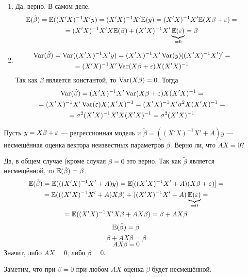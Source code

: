 \begin{problem}
\begin{sol}
\begin{enumerate}
\item
Да, верно. В самом деле,
\begin{multline*}
\mathbb{E}(\hat\beta)=\mathbb{E}((X'X)^{-1}X'y)=(X'X)^{-1}X'\mathbb{E}(y)=(X'X)^{-1}X'\mathbb{E}(X\beta+\varepsilon)=\\
=(X'X)^{-1}X'X\mathbb{E}(\beta)+(X'X)^{-1}X'\underbrace{\mathbb{E}(\varepsilon)}_{=0}=\beta
\end{multline*}


\item
\begin{multline*}
\operatorname{Var}(\hat\beta)=\operatorname{Var}((X'X)^{-1}X'y)=(X'X)^{-1}X'\operatorname{Var}(y)((X'X)^{-1}X')'=\\
=(X'X)^{-1}X'\operatorname{Var}(X\beta+\varepsilon)X(X'X)^{-1}
\end{multline*}
Так как $\beta$ является константой, то $\operatorname{Var}(X\beta)=0$. Тогда
\begin{multline*}
\operatorname{Var}(\hat\beta)=(X'X)^{-1}X'\operatorname{Var}(X\beta+\varepsilon)X(X'X)^{-1}=\\=(X'X)^{-1}X'\operatorname{Var}(\varepsilon)X(X'X)^{-1}=
(X'X)^{-1}X'\sigma^2X(X'X)^{-1}=\\=\sigma^2(X'X)^{-1}X'X(X'X)^{-1}=\sigma^2(X'X)^{-1}
\end{multline*}
\end{enumerate}

\end{sol}
\end{problem}


\begin{problem}
Пусть $y = X\beta + \varepsilon$ — регрессионная модель и $\tilde{\beta} = ((X'X)^{-1}X'+ A)y$ — несмещённая оценка вектора неизвестных параметров $\beta$. Верно ли, что $AX=0$?


\begin{sol}
Да, в общем случае (кроме случая $\beta=0$ это верно. Так как $\tilde\beta$ является несмещённой, то $\mathbb{E}(\tilde\beta)=\beta$.
\begin{multline*}
\mathbb{E}(\tilde\beta)=\mathbb{E}(((X'X)^{-1}X'+A)y)=\mathbb{E}[((X'X)^{-1}X'+A)(X\beta+\varepsilon)]=\\=
\mathbb{E}(((X'X)^{-1}X'+A)X\beta)+((X'X)^{-1}X'+A)\underbrace{\mathbb{E}(\varepsilon)}_{=0}=\\
=\mathbb{E}((X'X)^{-1}X'X\beta+AX\beta)=\beta+AX\beta
\end{multline*}
\[\mathbb{E}(\tilde\beta)=\beta\]
\[\beta+AX\beta=\beta\]
\[AX\beta=0\]
Значит, либо $AX=0$, либо $\beta=0$.

Заметим, что при $\beta=0$ при любом $AX$ оценка $\tilde\beta$ будет несмещённой.
\end{sol}
\end{problem}





